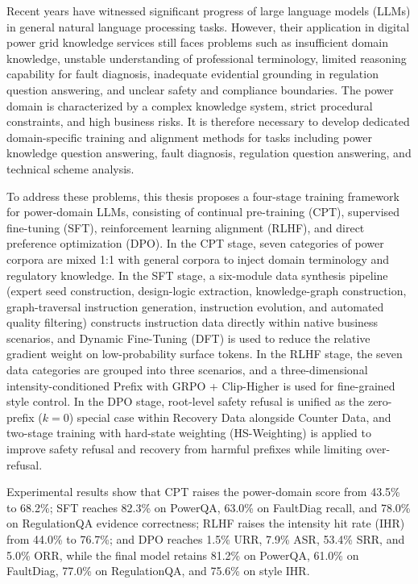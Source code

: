 \documentclass[fontset=fandol,type=master,campus=shenzhen,etitleauto=true]{hithesisbook}
\begin{document}
\begin{eabstract}
Recent years have witnessed significant progress of large language models (LLMs) in general natural language processing tasks. However, their application in digital power grid knowledge services still faces problems such as insufficient domain knowledge, unstable understanding of professional terminology, limited reasoning capability for fault diagnosis, inadequate evidential grounding in regulation question answering, and unclear safety and compliance boundaries. The power domain is characterized by a complex knowledge system, strict procedural constraints, and high business risks. It is therefore necessary to develop dedicated domain-specific training and alignment methods for tasks including power knowledge question answering, fault diagnosis, regulation question answering, and technical scheme analysis.

To address these problems, this thesis proposes a four-stage training framework for power-domain LLMs, consisting of continual pre-training (CPT), supervised fine-tuning (SFT), reinforcement learning alignment (RLHF), and direct preference optimization (DPO). In the CPT stage, seven categories of power corpora are mixed 1:1 with general corpora to inject domain terminology and regulatory knowledge. In the SFT stage, a six-module data synthesis pipeline (expert seed construction, design-logic extraction, knowledge-graph construction, graph-traversal instruction generation, instruction evolution, and automated quality filtering) constructs instruction data directly within native business scenarios, and Dynamic Fine-Tuning (DFT) is used to reduce the relative gradient weight on low-probability surface tokens. In the RLHF stage, the seven data categories are grouped into three scenarios, and a three-dimensional intensity-conditioned Prefix with GRPO + Clip-Higher is used for fine-grained style control. In the DPO stage, root-level safety refusal is unified as the zero-prefix ($k=0$) special case within Recovery Data alongside Counter Data, and two-stage training with hard-state weighting (HS-Weighting) is applied to improve safety refusal and recovery from harmful prefixes while limiting over-refusal.

Experimental results show that CPT raises the power-domain score from 43.5\% to 68.2\%; SFT reaches 82.3\% on PowerQA, 63.0\% on FaultDiag recall, and 78.0\% on RegulationQA evidence correctness; RLHF raises the intensity hit rate (IHR) from 44.0\% to 76.7\%; and DPO reaches 1.5\% URR, 7.9\% ASR, 53.4\% SRR, and 5.0\% ORR, while the final model retains 81.2\% on PowerQA, 61.0\% on FaultDiag, 77.0\% on RegulationQA, and 75.6\% on style IHR.
\end{eabstract}
\end{document}
